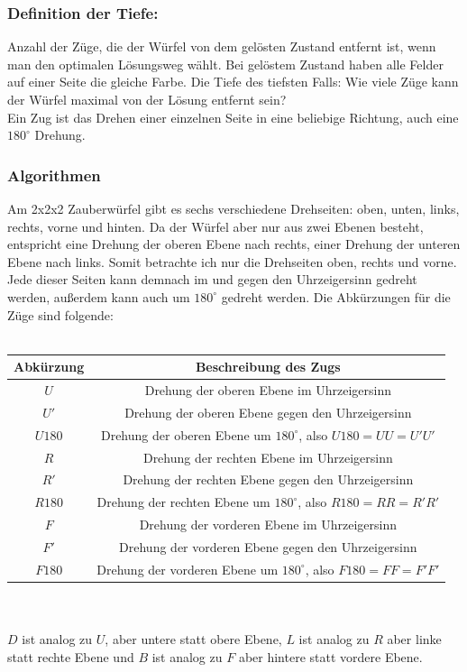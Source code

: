 \documentclass[12pt,a4paper, usenames, dvipsnames]{scrartcl}
\begin{document}
\subsubsection*{Definition der Tiefe:}
Anzahl der Züge, die der Würfel von dem gelösten Zustand entfernt ist, wenn man den optimalen Lösungsweg wählt. Bei gelöstem Zustand haben alle Felder auf einer Seite die gleiche Farbe. Die Tiefe des tiefsten Falls: Wie viele Züge kann der Würfel maximal von der Lösung entfernt sein? \\
Ein Zug ist das Drehen einer einzelnen Seite in eine beliebige Richtung, auch eine $180^\circ$ Drehung.

\subsubsection*{Algorithmen}
Am 2x2x2 Zauberwürfel gibt es sechs verschiedene Drehseiten: oben, unten, links, rechts, vorne und hinten. Da der Würfel aber nur aus zwei Ebenen besteht, entspricht eine Drehung der oberen Ebene nach rechts, einer Drehung der unteren Ebene nach links. Somit betrachte ich nur die Drehseiten oben, rechts und vorne. \\
Jede dieser Seiten kann demnach im und gegen den Uhrzeigersinn gedreht werden, außerdem kann auch um $180^\circ$ gedreht werden. Die Abkürzungen für die Züge sind folgende: \\
\\
\begin{tabular}{|c|c|}
\hline
Abkürzung & Beschreibung des Zugs \\
\hline
\hline
$U$ & Drehung der oberen Ebene im Uhrzeigersinn \\
\hline
$U'$ & Drehung der oberen Ebene gegen den Uhrzeigersinn \\
\hline
$U180$ & Drehung der oberen Ebene um $180^\circ$, also $U180= UU = U'U'$ \\
\hline
$R$ & Drehung der rechten Ebene im Uhrzeigersinn \\
\hline
$R'$ & Drehung der rechten Ebene gegen den Uhrzeigersinn \\
\hline
$R180$ & Drehung der rechten Ebene um $180^\circ$, also $R180= RR = R'R'$ \\
\hline
$F$ & Drehung der vorderen Ebene im Uhrzeigersinn \\
\hline
$F'$ & Drehung der vorderen Ebene gegen den Uhrzeigersinn \\
\hline
$F180$ & Drehung der vorderen Ebene um $180^\circ$, also $F180= FF = F'F'$ \\
\hline
\end{tabular} \\
\\
$D$ ist analog zu $U$, aber untere statt obere Ebene, $L$ ist analog zu $R$ aber linke statt rechte Ebene und $B$ ist analog zu $F$ aber hintere statt vordere Ebene. 
\end{document}
